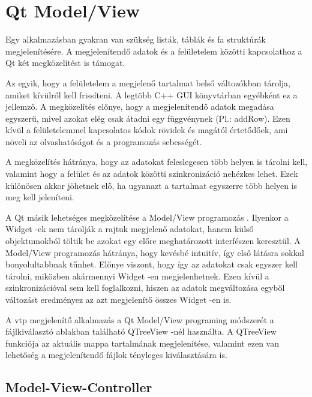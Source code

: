 \section{Qt Model/View}

Egy alkalmazásban gyakran van szükség listák, 
táblák és fa struktúrák megjelenítésére. 
A megjelenítendő adatok és a felületelem közötti kapcsolathoz
a Qt két megközelítést is támogat.

Az egyik, hogy a felületelem
a megjelenő tartalmat belső változókban tárolja,
amiket kívülről kell frissíteni.
A legtöbb C++ GUI könyvtárban egyébként ez a jellemző.
A megközelítés előnye, hogy a megjelenítendő adatok megadása egyszerű, 
mivel azokat elég csak átadni egy függvénynek (Pl.: {\ttfamily addRow}). 
Ezen kívül a felületelemmel kapcsolatos kódok rövidek és magától értetődőek, 
ami növeli az olvashatóságot és a programozás sebességét.

A megközelítés hátránya, 
hogy az adatokat feleslegesen több helyen is tárolni kell, 
valamint hogy a felület és az adatok közötti szinkronizáció nehézkes lehet. 
Ezek különösen akkor jöhetnek elő, 
ha ugyanazt a tartalmat egyszerre több helyen is meg kell jeleníteni.

A Qt másik lehetséges megközelítése 
a Model/View programozás \cite{qtmodelview}. 
Ilyenkor a Widget -ek nem tárolják a rajtuk megjelenő adatokat, 
hanem külső objektumokból töltik be azokat 
egy előre meghatározott interfészen keresztül. 
A Model/View programozás hátránya, 
hogy kevésbé intuitív, 
így első látásra sokkal bonyolultabbnak tűnhet. 
Előnye viszont, hogy így az adatokat csak egyszer kell tárolni, 
miközben akármennyi Widget -en megjelenhetnek. 
Ezen kívül a szinkronizációval sem kell foglalkozni, 
hiszen az adatok megváltozása egyből változást eredményez 
az azt megjelenítő összes Widget -en is.

A vtp megjelenítő alkalmazás a Qt Model/View programing módszerét 
a fájlkiválasztó ablakban található {\ttfamily QTreeView} -nél használta. 
A QTreeView funkciója az aktuális mappa tartalmának megjelenítése, 
valamint ezen van lehetőség a megjelenítendő fájlok tényleges kiválasztására is.

\subsection{Model-View-Controller}

